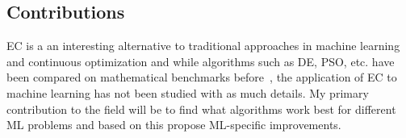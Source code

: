 \subsection{Contributions}

EC is a an interesting alternative to traditional approaches in machine learning and continuous optimization and while algorithms such as DE, PSO, etc. have been compared on mathematical benchmarks before~\cite{vesterstrom2004comparative, price1997differential}, the application of EC to machine learning has not been studied with as much details. My primary contribution to the field will be to find what algorithms work best for different ML problems and based on this propose ML-specific improvements.
